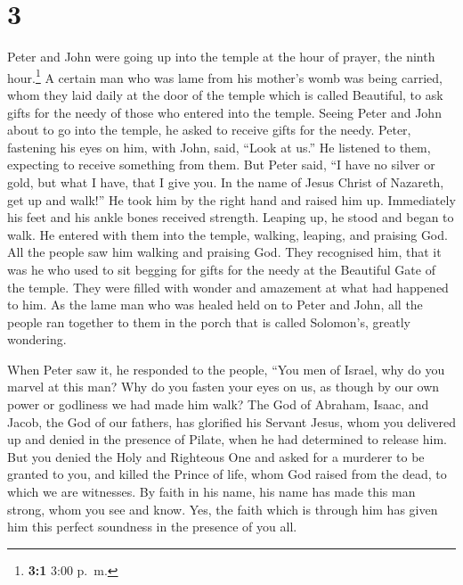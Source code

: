 \hypertarget{section-2}{%
\section{3}\label{section-2}}

 Peter and John were going up into the temple at the hour
of prayer, the ninth hour.\footnote{\textbf{3:1} 3:00 p.~m.}
 A certain man who was lame from his mother's womb was
being carried, whom they laid daily at the door of the temple which is
called Beautiful, to ask gifts for the needy of those who entered into
the temple.  Seeing Peter and John about to go into the
temple, he asked to receive gifts for the needy.  Peter,
fastening his eyes on him, with John, said, ``Look at us.''
 He listened to them, expecting to receive something from
them.  But Peter said, ``I have no silver or gold, but
what I have, that I give you. In the name of Jesus Christ of Nazareth,
get up and walk!''  He took him by the right hand and
raised him up. Immediately his feet and his ankle bones received
strength.  Leaping up, he stood and began to walk. He
entered with them into the temple, walking, leaping, and praising God.
 All the people saw him walking and praising God.
 They recognised him, that it was he who used to sit
begging for gifts for the needy at the Beautiful Gate of the temple.
They were filled with wonder and amazement at what had happened to him.
 As the lame man who was healed held on to Peter and
John, all the people ran together to them in the porch that is called
Solomon's, greatly wondering.

 When Peter saw it, he responded to the people, ``You men
of Israel, why do you marvel at this man? Why do you fasten your eyes on
us, as though by our own power or godliness we had made him walk?
 The God of Abraham, Isaac, and Jacob, the God of our
fathers, has glorified his Servant Jesus, whom you delivered up and
denied in the presence of Pilate, when he had determined to release him.
 But you denied the Holy and Righteous One and asked for
a murderer to be granted to you,  and killed the Prince
of life, whom God raised from the dead, to which we are witnesses.
 By faith in his name, his name has made this man strong,
whom you see and know. Yes, the faith which is through him has given him
this perfect soundness in the presence of you all.

